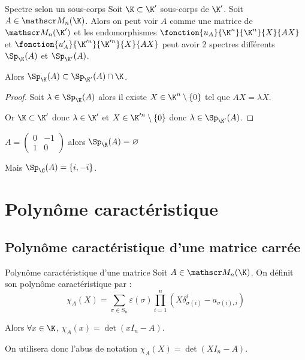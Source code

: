 \begin{proposition}{Spectre selon un sous-corps}{}
    Soit $\K \subset \K'$ sous-corps de $\K'$. 
    Soit $A \in \mathscr M_n(\K)$. Alors on peut voir $A$ comme une matrice de 
    $\mathscr M_n(\K')$ et les endomorphismes 
    $\fonction{u_A}{\K^n}{\K^n}{X}{AX}$ et
    $\fonction{u'_A}{\K'^n}{\K'^n}{X}{AX}$ peut avoir 2 spectres différents 
    $\Sp_{\K} (A)$ et $\Sp_{\K'}(A)$.

    Alors $\Sp_{\K} (A) \subset \Sp_{\K'}(A) \cap \K$.
\end{proposition}

\begin{proof}
    Soit $\lambda \in \Sp_{\K} (A)$ alors il existe $X \in \K^n \setminus \{0\}$ tel que
    $AX = \lambda X$.

    Or $\K \subset \K'$ donc $\lambda \in \K'$ et $X \in \K'^n \setminus \{0\}$ donc
    $\lambda \in \Sp_{\K'}(A)$.
\end{proof}

\begin{exemple}
    $A = \begin{pmatrix}
        0 & -1 \\
        1 & 0
    \end{pmatrix}$ alors $\Sp_{\R}(A) = \varnothing$ 

    Mais $\Sp_{\C}(A) = \{i, -i\}$.
\end{exemple}


\section{Polynôme caractéristique }
\subsection{Polynôme caractéristique d'une matrice carrée}

\begin{definition}{Polynôme caractéristique d'une matrice}{}
    Soit $A \in \mathscr M_n (\K)$. On définit son polynôme caractéristique par : 
    \[
        \chi_A(X) = \sum_{\sigma \in S_n} \varepsilon(\sigma) \prod_{i = 1 }^{ n } (X \delta_{\sigma(i)}^i - a_{\sigma(i), i})
    \]

    Alors $\forall x \in \K$, $\chi_A(x) = \det (x I_n - A)$.

    On utilisera donc l'abus de notation $\chi_A(X) = \det (X I_n - A)$.
\end{definition}


